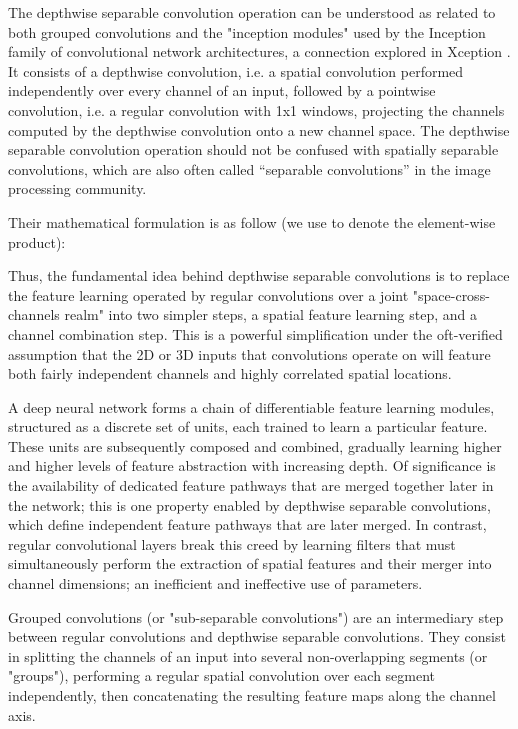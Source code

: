 \documentclass{article}
\begin{document}
The depthwise separable convolution operation can be understood as related to both grouped convolutions and the "inception modules" used by the Inception family of convolutional network architectures, a connection explored in Xception \citep{xception2016}. It consists of a depthwise convolution, i.e. a spatial convolution performed independently over every channel of an input, followed by a pointwise convolution, i.e. a regular convolution with 1x1 windows, projecting the channels computed by the depthwise convolution onto a new channel space. The depthwise separable convolution operation should not be confused with spatially separable convolutions, which are also often called “separable convolutions” in the image processing community.

Their mathematical formulation is as follow (we use  to denote the element-wise product):



Thus, the fundamental idea behind depthwise separable convolutions is to replace the feature learning operated by regular convolutions over a joint "space-cross-channels realm" into two simpler steps, a spatial feature learning step, and a channel combination step. This is a powerful simplification under the oft-verified assumption that the 2D or 3D inputs that convolutions operate on will feature both fairly independent channels and highly correlated spatial locations.

A deep neural network forms a chain of differentiable feature learning modules, structured as a discrete set of units, each trained to learn a particular feature. These units are subsequently composed and combined, gradually learning higher and higher levels of feature abstraction with increasing depth. Of significance is the availability of dedicated feature pathways that are merged together later in the network; this is one property enabled by depthwise separable convolutions, which define independent feature pathways that are later merged. In contrast, regular convolutional layers break this creed by learning filters that must simultaneously perform the extraction of spatial features and their merger into channel dimensions; an inefficient and ineffective use of parameters.

Grouped convolutions (or "sub-separable convolutions") are an intermediary step between regular convolutions and depthwise separable convolutions. They consist in splitting the channels of an input into several non-overlapping segments (or "groups"), performing a regular spatial convolution over each segment independently, then concatenating the resulting feature maps along the channel axis.
\end{document}
